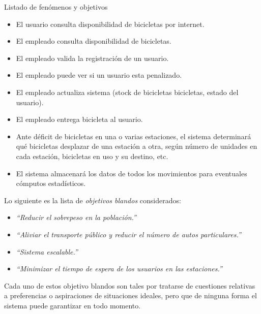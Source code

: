\begin{subsection}{Listado de fenómenos y objetivos}
\begin{itemize}
\item El usuario consulta disponibilidad de bicicletas por internet.
\item El empleado consulta disponibilidad de bicicletas.
\item El empleado valida la registración de un usuario. 
\item El empleado puede ver si un usuario esta penalizado.
\item El empleado actualiza sistema (stock de bicicletas bicicletas, estado del usuario).
\item El empleado entrega bicicleta al usuario.
\item Ante déficit de bicicletas en una o varias estaciones, el sistema determinará qué bicicletas desplazar de una estación a otra, según número de unidades en cada estación, bicicletas en uso y su destino, etc.
\item El sistema almacenará los datos de todos los movimientos para eventuales cómputos estadísticos.
\end{itemize}

Lo siguiente es la lista de \emph{objetivos blandos} considerados:

\begin{itemize}
\item \emph{``Reducir el sobrepeso en la población.''}
\item \emph{``Aliviar el transporte público y reducir el número de autos particulares.''}
\item \emph{``Sistema escalable.''}
\item \emph{``Minimizar el tiempo de espera de los usuarios en las estaciones.''}
\end{itemize}

Cada uno de estos objetivo blandos son tales por tratarse de cuestiones relativas a preferencias o aspiraciones de situaciones ideales, pero que de ninguna forma el sistema puede garantizar en todo momento.

\end{subsection} 

